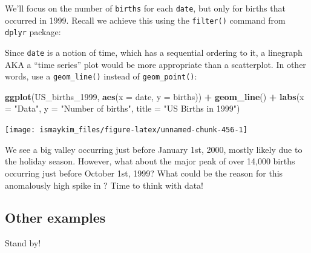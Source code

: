 \documentclass[12pt,]{krantz}
\makeatletter
\newenvironment{Shaded}{\begin{snugshade}}{\end{snugshade}}
\newcommand{\KeywordTok}[1]{\textcolor[rgb]{0.27,0.27,0.27}{\textbf{#1}}}
\newcommand{\DataTypeTok}[1]{\textcolor[rgb]{0.27,0.27,0.27}{#1}}
\newcommand{\DecValTok}[1]{\textcolor[rgb]{0.06,0.06,0.06}{#1}}
\newcommand{\StringTok}[1]{\textcolor[rgb]{0.5,0.5,0.5}{#1}}
\newcommand{\OperatorTok}[1]{\textcolor[rgb]{0.43,0.43,0.43}{\textbf{#1}}}
\newcommand{\NormalTok}[1]{#1}
\newenvironment{kframe}{%
\medskip{}
\setlength{\fboxsep}{.8em}
 \def\at@end@of@kframe{}%
 \ifinner\ifhmode%
  \def\at@end@of@kframe{\end{minipage}}%
  \begin{minipage}{\columnwidth}%
 \fi\fi%
 \def\FrameCommand##1{\hskip\@totalleftmargin \hskip-\fboxsep
 \colorbox{shadecolor}{##1}\hskip-\fboxsep
     \hskip-\linewidth \hskip-\@totalleftmargin \hskip\columnwidth}%
 \MakeFramed {\advance\hsize-\width
   \@totalleftmargin\z@ \linewidth\hsize
   \@setminipage}}%
 {\par\unskip\endMakeFramed%
 \at@end@of@kframe}
\renewenvironment{Shaded}{\begin{kframe}}{\end{kframe}}
\theoremstyle{definition}
\theoremstyle{definition}
\theoremstyle{definition}
\theoremstyle{remark}
\makeatother
\begin{document}
We'll focus on the number of \texttt{births} for each \texttt{date}, but
only for births that occurred in 1999. Recall we achieve this using the
\texttt{filter()} command from \texttt{dplyr} package:

\begin{Shaded}
\end{Shaded}

Since \texttt{date} is a notion of time, which has a sequential ordering
to it, a linegraph AKA a ``time series'' plot would be more appropriate
than a scatterplot. In other words, use a \texttt{geom\_line()} instead
of \texttt{geom\_point()}:

\begin{Shaded}
\begin{Highlighting}[]
\KeywordTok{ggplot}\NormalTok{(US_births_}\DecValTok{1999}\NormalTok{, }\KeywordTok{aes}\NormalTok{(}\DataTypeTok{x =}\NormalTok{ date, }\DataTypeTok{y =}\NormalTok{ births)) }\OperatorTok{+}
\StringTok{  }\KeywordTok{geom_line}\NormalTok{() }\OperatorTok{+}
\StringTok{  }\KeywordTok{labs}\NormalTok{(}\DataTypeTok{x =} \StringTok{"Data"}\NormalTok{, }\DataTypeTok{y =} \StringTok{"Number of births"}\NormalTok{, }\DataTypeTok{title =} \StringTok{"US Births in 1999"}\NormalTok{)}
\end{Highlighting}
\end{Shaded}

\begin{center}\texttt{[image: ismaykim\_files/figure-latex/unnamed-chunk-456-1]} \end{center}

We see a big valley occurring just before January 1st, 2000, mostly
likely due to the holiday season. However, what about the major peak of
over 14,000 births occurring just before October 1st, 1999? What could
be the reason for this anomalously high spike in ? Time to think with
data!

\subsection{Other examples}\label{other-examples}

Stand by!
\end{document}

